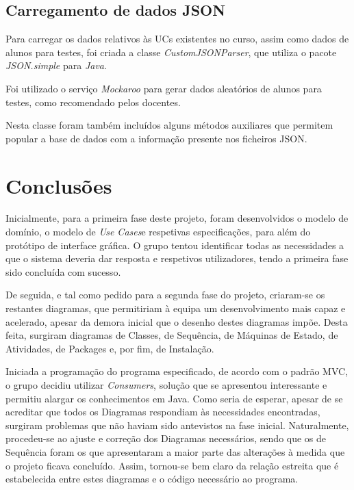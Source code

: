 \documentclass[a4paper]{article}
\begin{document}
\subsection{Carregamento de dados JSON}
Para carregar os dados relativos às UCs existentes no curso, assim como dados de alunos para testes, foi criada a classe \emph{CustomJSONParser}, que utiliza o pacote \emph{JSON.simple} para \emph{Java}.

Foi utilizado o serviço \emph{Mockaroo} para gerar dados aleatórios de alunos para testes, como recomendado pelos docentes.

Nesta classe foram também incluídos alguns métodos auxiliares que permitem popular a base de dados com a informação presente nos ficheiros JSON.

\pagebreak
\section{Conclusões}
\hspace{3mm}Inicialmente, para a primeira fase deste projeto, foram desenvolvidos o modelo de domínio, o modelo de \textit{Use Cases}e respetivas especificações, para além do protótipo de interface gráfica. O grupo tentou identificar todas as necessidades a que o sistema deveria dar resposta e respetivos utilizadores, tendo a primeira fase sido concluída com sucesso.

De seguida, e tal como pedido para a segunda fase do projeto, criaram-se os restantes diagramas, que permitiriam à equipa um desenvolvimento mais capaz e acelerado, apesar da demora inicial que o desenho destes diagramas impõe. Desta feita, surgiram diagramas de Classes, de Sequência, de Máquinas de Estado, de Atividades, de Packages e, por fim, de Instalação.

Iniciada a programação do programa especificado, de acordo com o padrão MVC, o grupo decidiu utilizar \textit{Consumers}, solução que se apresentou interessante e permitiu alargar os conhecimentos em Java. Como seria de esperar, apesar de se acreditar que todos os Diagramas respondiam às necessidades encontradas, surgiram problemas que não haviam sido antevistos na fase inicial. Naturalmente, procedeu-se ao ajuste e correção dos Diagramas necessários, sendo que os de Sequência foram os que apresentaram a maior parte das alterações à medida que o projeto ficava concluído. Assim, tornou-se bem claro da relação estreita que é estabelecida entre estes diagramas e o código necessário ao programa.
\end{document}

